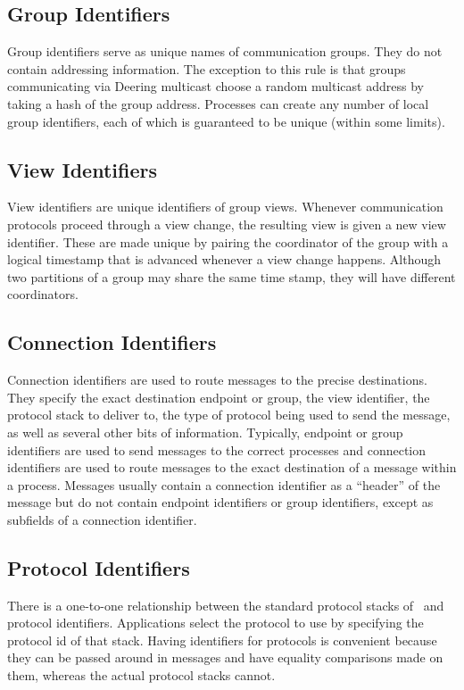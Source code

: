 \subsection{Group Identifiers}
Group identifiers serve as unique names of communication groups.  They
do not contain addressing information.  The exception to this rule is
that groups communicating via Deering multicast choose a random
multicast address by taking a hash of the group address.  Processes
can create any number of local group identifiers, each of which is
guaranteed to be unique (within some limits).

\subsection{View Identifiers}
View identifiers are unique identifiers of group views.  Whenever
communication protocols proceed through a view change, the resulting
view is given a new view identifier.  These are made unique by pairing
the coordinator of the group with a logical timestamp that is advanced
whenever a view change happens.  Although two partitions of a group
may share the same time stamp, they will have different coordinators.

\subsection{Connection Identifiers}
Connection identifiers are used to route messages to the precise
destinations.  They specify the exact destination endpoint or group,
the view identifier, the protocol stack to deliver to, the type of
protocol being used to send the message, as well as several other bits
of information.  Typically, endpoint or group identifiers are used to
send messages to the correct processes and connection identifiers are
used to route messages to the exact destination of a message within a
process.  Messages usually contain a connection identifier as a
``header'' of the message but do not contain endpoint identifiers or
group identifiers, except as subfields of a connection identifier.

\subsection{Protocol Identifiers}
There is a one-to-one relationship between the standard protocol
stacks of \ensemble\ and protocol identifiers.  Applications select
the protocol to use by specifying the protocol id of that stack.
Having identifiers for protocols is convenient because they can be
passed around in messages and have equality comparisons made on them,
whereas the actual protocol stacks cannot.

